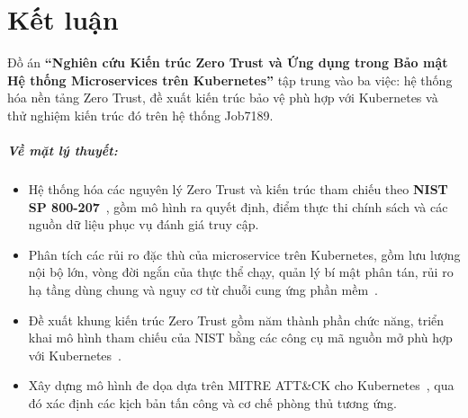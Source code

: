 
\chapter*{Kết luận}

Đồ án \textbf{``Nghiên cứu Kiến trúc Zero Trust và Ứng dụng trong Bảo mật Hệ thống Microservices trên Kubernetes''} tập trung vào ba việc: hệ thống hóa nền tảng Zero Trust, đề xuất kiến trúc bảo vệ phù hợp với Kubernetes và thử nghiệm kiến trúc đó trên hệ thống Job7189.

\paragraph{Về mặt lý thuyết:}
\begin{itemize}
    \item Hệ thống hóa các nguyên lý Zero Trust và kiến trúc tham chiếu theo \textbf{NIST SP 800-207}~\parencite{nist800207,kindervag2010build,gilman2017zero}, gồm mô hình ra quyết định, điểm thực thi chính sách và các nguồn dữ liệu phục vụ đánh giá truy cập.
    \item Phân tích các rủi ro đặc thù của microservice trên Kubernetes, gồm lưu lượng nội bộ lớn, vòng đời ngắn của thực thể chạy, quản lý bí mật phân tán, rủi ro hạ tầng dùng chung và nguy cơ từ chuỗi cung ứng phần mềm~\parencite{nist800204_microservices,rice2019kubernetes,machine_identity_report}.
    \item Đề xuất khung kiến trúc Zero Trust gồm năm thành phần chức năng, triển khai mô hình tham chiếu của NIST bằng các công cụ mã nguồn mở phù hợp với Kubernetes~\parencite{nist800207,kubernetes_docs,cisa_ztmm2023}.
    \item Xây dựng mô hình đe dọa dựa trên MITRE ATT\&CK cho Kubernetes~\parencite{mitre_containers,owasp_api2023}, qua đó xác định các kịch bản tấn công và cơ chế phòng thủ tương ứng.
\end{itemize}

